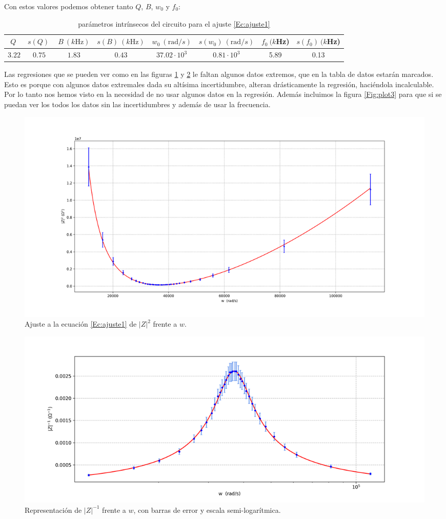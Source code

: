 \documentclass[12pt,a4paper]{article}
\newcommand{\Hz}{\mathrm{Hz} }
\begin{document}
 


Con estos valores podemos obtener tanto $Q$, $B$, $w_0$ y $f_0$: \\

\begin{table}[h!] 	 \centering 
\begin{tabular}{|c|c|c|c|c|c|c|c|} 
\hline 
$Q \  $  & $s(Q) \ $ & $ B \ (k \Hz)$ & $s(B) \ (k \Hz)$ & $w_0 \ (\mathrm{rad}/s)  $ &  $s(w_0) \ (\mathrm{rad}/s)$  & $f_0 \ (k$Hz) & $s(f_0) \  (k$Hz) \\ \hline 
$3.22 $  & $0.75 $ & $ 1.83 $ & $0.43$ & $37.02 \cdot 10^3  $ & $0.81 \cdot 10^3 $ & 5.89 & 0.13 \\ 
\hline
\end{tabular} 
\caption{parámetros intrínsecos del circuito para el ajuste \ref{Ec:ajuste1}} 
\label{Tab:valores2} 
\end{table} 
 
Las regresiones que se pueden ver como en las figuras \ref{Fig:plot1} y \ref{Fig:plot2} le faltan algunos datos extremos, que en la tabla de datos estarán marcados. Esto es porque con algunos datos extremales dada su altísima incertidumbre, alteran drásticamente la regresión, haciéndola incalculable. Por lo tanto nos hemos visto en la necesidad de no usar algunos datos en la regresión. Además incluimos la figura \ref{Fig:plot3} para que si se puedan ver los todos los datos sin las incertidumbres y además de usar la frecuencia. 

\begin{figure}[h!] \centering 
\includegraphics[scale=0.45]{plot1.png}
\caption{Ajuste a la ecuación \ref{Ec:ajuste1} de $|Z|^2$ frente a $w$.}
\label{Fig:plot1}
\end{figure}
 
\begin{figure}[h!] \centering
\includegraphics[scale=0.60]{plot2.png}
\caption{Representación de $|Z|^{-1}$ frente a $w$, con barras de error y escala semi-logarítmica.}
\label{Fig:plot2}
\end{figure}
 
\end{document}
